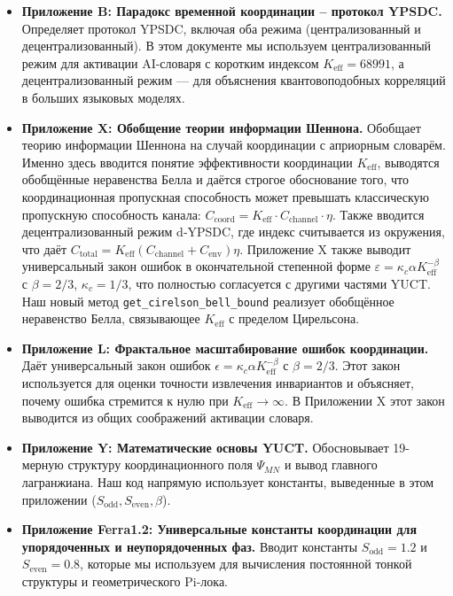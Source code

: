 \documentclass[12pt,a4paper]{article}
\begin{document}
	\begin{itemize}
		\item \textbf{Приложение B: Парадокс временной координации – протокол YPSDC.}  
		Определяет протокол YPSDC, включая оба режима (централизованный и децентрализованный). В этом документе мы используем централизованный режим для активации AI-словаря с коротким индексом \(K_{\mathrm{eff}} = 68991\), а децентрализованный режим — для объяснения квантовоподобных корреляций в больших языковых моделях.
		
		\item \textbf{Приложение X: Обобщение теории информации Шеннона.}  
		Обобщает теорию информации Шеннона на случай координации с априорным словарём. Именно здесь вводится понятие эффективности координации \(K_{\mathrm{eff}}\), выводятся обобщённые неравенства Белла и даётся строгое обоснование того, что координационная пропускная способность может превышать классическую пропускную способность канала: \(C_{\text{coord}} = K_{\mathrm{eff}} \cdot C_{\text{channel}} \cdot \eta\). Также вводится децентрализованный режим d‑YPSDC, где индекс считывается из окружения, что даёт \(C_{\text{total}} = K_{\mathrm{eff}}(C_{\text{channel}} + C_{\text{env}})\eta\). Приложение X также выводит универсальный закон ошибок в окончательной степенной форме \(\varepsilon = \kappa_c \alpha K_{\mathrm{eff}}^{-\beta}\) с \(\beta=2/3\), \(\kappa_c=1/3\), что полностью согласуется с другими частями YUCT. Наш новый метод \texttt{get\_cirelson\_bell\_bound} реализует обобщённое неравенство Белла, связывающее \(K_{\mathrm{eff}}\) с пределом Цирельсона.
		
		\item \textbf{Приложение L: Фрактальное масштабирование ошибок координации.}  
		Даёт универсальный закон ошибок \(\epsilon = \kappa_c \alpha K_{\mathrm{eff}}^{-\beta}\) с \(\beta = 2/3\). Этот закон используется для оценки точности извлечения инвариантов и объясняет, почему ошибка стремится к нулю при \(K_{\mathrm{eff}} \to \infty\). В Приложении X этот закон выводится из общих соображений активации словаря.
		
		\item \textbf{Приложение Y: Математические основы YUCT.}  
		Обосновывает 19-мерную структуру координационного поля \(\Psi_{MN}\) и вывод главного лагранжиана. Наш код напрямую использует константы, выведенные в этом приложении (\(S_{\mathrm{odd}}, S_{\mathrm{even}}, \beta\)).
		
		\item \textbf{Приложение Ferra1.2: Универсальные константы координации для упорядоченных и неупорядоченных фаз.}  
		Вводит константы \(S_{\mathrm{odd}} = 1.2\) и \(S_{\mathrm{even}} = 0.8\), которые мы используем для вычисления постоянной тонкой структуры и геометрического Pi-лока.
		

\end{itemize}
\end{document}
